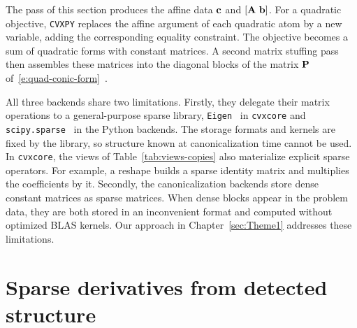 The pass of this section produces the affine data $\mathbf{c}$ and $[\mathbf{A}\ \mathbf{b}]$.
For a quadratic objective, \texttt{CVXPY} replaces the affine argument of each quadratic
atom by a new variable, adding the corresponding equality constraint. The objective becomes
a sum of quadratic forms with constant matrices. A second matrix stuffing pass then
assembles these matrices into the diagonal blocks of the matrix $\mathbf{P}$
of~\eqref{e:quad-conic-form}~\cite{cvxpy2026source}.

All three backends share two limitations. Firstly, they delegate their matrix operations to a
general-purpose sparse library, \texttt{Eigen}~\cite{guennebaud2010eigen} in \texttt{cvxcore} and
\texttt{scipy.sparse}~\cite{2020SciPy-NMeth} in the Python backends.
The storage formats and kernels are fixed by the
library, so structure known at canonicalization time cannot be used. In
\texttt{cvxcore}, the views of Table~\ref{tab:views-copies} also materialize explicit sparse
operators. For example, a reshape builds a sparse identity matrix and multiplies the
coefficients by it.
Secondly, the canonicalization backends store dense constant matrices as sparse matrices.
When dense blocks appear in the problem data, they are both stored in an inconvenient format
and computed without optimized BLAS kernels.
Our approach in Chapter~\ref{sec:Theme1} addresses these limitations.
\section{Sparse derivatives from detected structure}
\label{sec:computing-derivatives}

